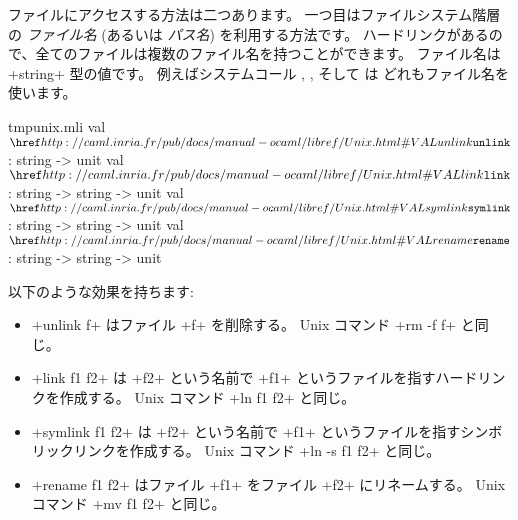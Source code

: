 ファイルにアクセスする方法は二つあります。
一つ目はファイルシステム階層の \emph{ファイル名} (あるいは \emph{パス名}) を利用する方法です。
ハードリンクがあるので、全てのファイルは複数のファイル名を持つことができます。
ファイル名は \ml+string+ 型の値です。
例えばシステムコール , ,  そして  は
どれもファイル名を使います。
%
\begin{listingcodefile}{tmpunix.mli}
val $\libvalue{Unix}{unlink}$ : string -> unit
val $\libvalue{Unix}{link}$ : string -> string -> unit
val $\libvalue{Unix}{symlink}$ : string -> string -> unit
val $\libvalue{Unix}{rename}$ : string -> string -> unit
\end{listingcodefile}
%
以下のような効果を持ちます:
\begin{itemize}
\item \ml+unlink f+ はファイル \ml+f+ を削除する。 Unix コマンド \ml+rm -f f+ と同じ。
%
\item \ml+link f1 f2+ は \ml+f2+ という名前で \ml+f1+ というファイルを指すハードリンクを作成する。
  Unix コマンド \ml+ln f1 f2+ と同じ。
%
\item \ml+symlink f1 f2+ は \ml+f2+ という名前で \ml+f1+ というファイルを指すシンボリックリンクを作成する。
  Unix コマンド \ml+ln -s f1 f2+ と同じ。
%
\item \ml+rename f1 f2+ はファイル \ml+f1+ をファイル \ml+f2+ にリネームする。
  Unix コマンド \ml+mv f1 f2+ と同じ。
\end{itemize}

